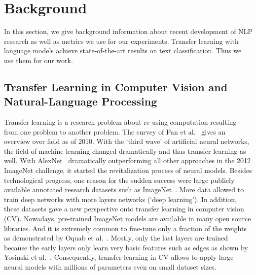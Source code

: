 \chapter{Background}
\label{ch:background}

In this section, we give background information about recent development of NLP research as well as metrics we use for our experiments.
Transfer learning with language models achieve state-of-the-art results on text classification.
Thus we use them for our work.

\section{Transfer Learning in Computer Vision and Natural-Language Processing}

Transfer learning is a research problem about re-using computation resulting from one problem to another problem. The survey of Pan et al.~\cite{pan2010survey} gives an overview over field as of 2010. With the `third wave' of artificial neural networks, the field of machine learning changed dramatically and thus transfer learning as well. With AlexNet~\cite{NIPS2012_4824} dramatically outperforming all other approaches in the 2012 ImageNet challenge, it started the revitalization process of neural models. Besides technological progress, one reason for the sudden success were large publicly available annotated research datasets such as ImageNet~\cite{imagenet_cvpr09}.
More data allowed to train deep networks with more layers networks (`deep learning'). In addition, these datasets gave a new perspective onto transfer learning in computer vision (CV). Nowadays, pre-trained ImageNet models are available in many open source libraries. And it is extremely common to fine-tune only a fraction of the weights as demonstrated by Oquab et al.~\cite{Oquab_2014_CVPR}. Mostly, only the last layers are trained because the early layers only learn very basic features such as edges as shown by Yosinski et al.~\cite{Yosinski:2014:TFD:2969033.2969197}. Consequently, transfer learning in CV allows to apply large neural models with millions of parameters even on small dataset sizes.

